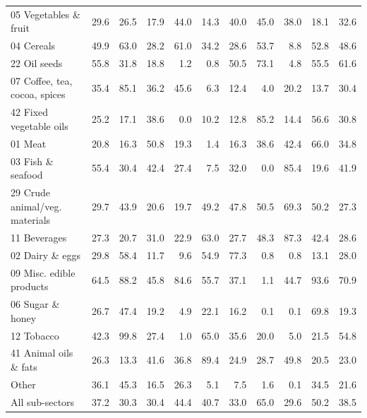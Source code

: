\begin{tabular}{lrrrrrrrrrr}
05 Vegetables \& fruit & 29.6 & 26.5 & 17.9 & 44.0 & 14.3 & 40.0 & 45.0 & 38.0 & 18.1 & 32.6 \\
04 Cereals & 49.9 & 63.0 & 28.2 & 61.0 & 34.2 & 28.6 & 53.7 & 8.8 & 52.8 & 48.6 \\
22 Oil seeds & 55.8 & 31.8 & 18.8 & 1.2 & 0.8 & 50.5 & 73.1 & 4.8 & 55.5 & 61.6 \\
07 Coffee, tea, cocoa, spices & 35.4 & 85.1 & 36.2 & 45.6 & 6.3 & 12.4 & 4.0 & 20.2 & 13.7 & 30.4 \\
42 Fixed vegetable oils & 25.2 & 17.1 & 38.6 & 0.0 & 10.2 & 12.8 & 85.2 & 14.4 & 56.6 & 30.8 \\
01 Meat & 20.8 & 16.3 & 50.8 & 19.3 & 1.4 & 16.3 & 38.6 & 42.4 & 66.0 & 34.8 \\
03 Fish \& seafood & 55.4 & 30.4 & 42.4 & 27.4 & 7.5 & 32.0 & 0.0 & 85.4 & 19.6 & 41.9 \\
29 Crude animal/veg. materials & 29.7 & 43.9 & 20.6 & 19.7 & 49.2 & 47.8 & 50.5 & 69.3 & 50.2 & 27.3 \\
11 Beverages & 27.3 & 20.7 & 31.0 & 22.9 & 63.0 & 27.7 & 48.3 & 87.3 & 42.4 & 28.6 \\
02 Dairy \& eggs & 29.8 & 58.4 & 11.7 & 9.6 & 54.9 & 77.3 & 0.8 & 0.8 & 13.1 & 28.0 \\
09 Misc. edible products & 64.5 & 88.2 & 45.8 & 84.6 & 55.7 & 37.1 & 1.1 & 44.7 & 93.6 & 70.9 \\
06 Sugar \& honey & 26.7 & 47.4 & 19.2 & 4.9 & 22.1 & 16.2 & 0.1 & 0.1 & 69.8 & 19.3 \\
12 Tobacco & 42.3 & 99.8 & 27.4 & 1.0 & 65.0 & 35.6 & 20.0 & 5.0 & 21.5 & 54.8 \\
41 Animal oils \& fats & 26.3 & 13.3 & 41.6 & 36.8 & 89.4 & 24.9 & 28.7 & 49.8 & 20.5 & 23.0 \\
Other & 36.1 & 45.3 & 16.5 & 26.3 & 5.1 & 7.5 & 1.6 & 0.1 & 34.5 & 21.6 \\
All sub-sectors & 37.2 & 30.3 & 30.4 & 44.4 & 40.7 & 33.0 & 65.0 & 29.6 & 50.2 & 38.5 \\
\bottomrule
\end{tabular}
